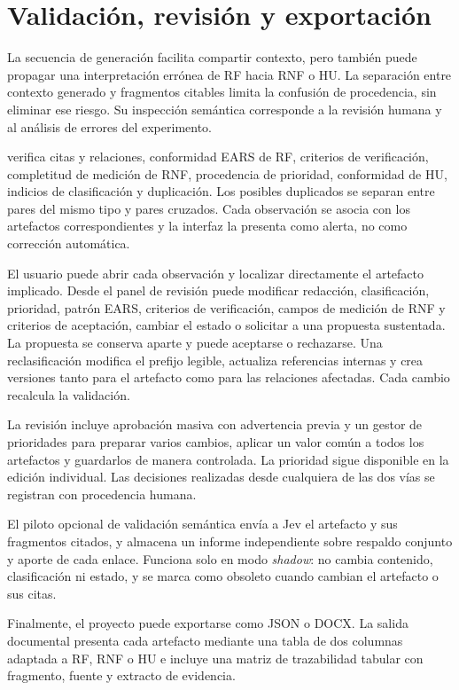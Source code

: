 \section{Validación, revisión y exportación}

La secuencia de generación facilita compartir contexto, pero también puede propagar una interpretación errónea de RF hacia RNF o HU. La separación entre contexto generado y fragmentos citables limita la confusión de procedencia, sin eliminar ese riesgo. Su inspección semántica corresponde a la revisión humana y al análisis de errores del experimento.

 verifica citas y relaciones, conformidad EARS de RF, criterios de verificación, completitud de medición de RNF, procedencia de prioridad, conformidad de HU, indicios de clasificación y duplicación. Los posibles duplicados se separan entre pares del mismo tipo y pares cruzados. Cada observación se asocia con los artefactos correspondientes y la interfaz la presenta como alerta, no como corrección automática.

El usuario puede abrir cada observación y localizar directamente el artefacto implicado. Desde el panel de revisión puede modificar redacción, clasificación, prioridad, patrón EARS, criterios de verificación, campos de medición de RNF y criterios de aceptación, cambiar el estado o solicitar a  una propuesta sustentada. La propuesta se conserva aparte y puede aceptarse o rechazarse. Una reclasificación modifica el prefijo legible, actualiza referencias internas y crea versiones tanto para el artefacto como para las relaciones afectadas. Cada cambio recalcula la validación.

La revisión incluye aprobación masiva con advertencia previa y un gestor de prioridades para preparar varios cambios, aplicar un valor común a todos los artefactos y guardarlos de manera controlada. La prioridad sigue disponible en la edición individual. Las decisiones realizadas desde cualquiera de las dos vías se registran con procedencia humana.

El piloto opcional de validación semántica envía a Jev el artefacto y sus fragmentos citados, y almacena un informe independiente sobre respaldo conjunto y aporte de cada enlace. Funciona solo en modo \emph{shadow}: no cambia contenido, clasificación ni estado, y se marca como obsoleto cuando cambian el artefacto o sus citas.

Finalmente, el proyecto puede exportarse como JSON o DOCX. La salida documental presenta cada artefacto mediante una tabla de dos columnas adaptada a RF, RNF o HU e incluye una matriz de trazabilidad tabular con fragmento, fuente y extracto de evidencia.

